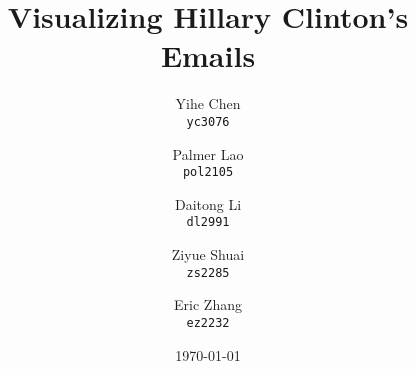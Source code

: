 \documentclass[11pt]{article}
\begin{document}
\title{Visualizing Hillary Clinton's Emails}

\author{
  Yihe Chen \\
  \texttt{yc3076}
  \and 
  Palmer Lao \\
  \texttt{pol2105}
  \and
  Daitong Li \\
  \texttt{dl2991}
  \and
  Ziyue Shuai \\
  \texttt{zs2285}
  \and
  Eric Zhang \\ 
  \texttt{ez2232}
}

\date{\today}
\maketitle
\end{document}
